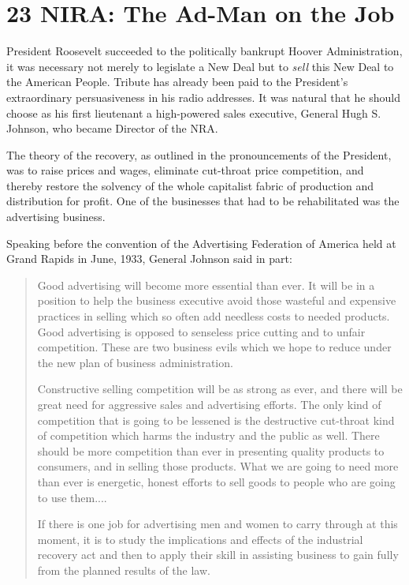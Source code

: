 \documentclass[twoside,nohyper,openany,nobib]{tufte-book}
\let\oldchapter\chapter
\def\chapter{%
  \setcounter{footnote}{0}%
  \oldchapter
}
\begin{document}
\chapter[23 \hspace*{1mm} NIRA: The Ad-Man on the Job]{23 NIRA: The Ad-Man on the Job}

 President Roosevelt succeeded to the politically bankrupt Hoover
Administration, it was necessary not merely to legislate a New Deal but
to \emph{sell} this New Deal to the American People. Tribute has already
been paid to the President's extraordinary persuasiveness in his radio
addresses. It was natural that he should choose as his first lieutenant
a high-powered sales executive, General Hugh S. Johnson, who became
Director of the NRA.

The theory of the recovery, as outlined in the pronouncements of the
President, was to raise prices and wages, eliminate cut-throat price
competition, and thereby restore the solvency of the whole capitalist
fabric of production and distribution for profit. One of the businesses
that had to be rehabilitated was the advertising business.

Speaking before the convention of the Advertising Federation of America
held at Grand Rapids in June, 1933, General Johnson said in part:

\begin{quote}
Good advertising will become more essential than ever. It will be in a
position to help the business executive avoid those wasteful and
expensive practices in selling which so often add needless costs to
needed products. Good advertising is opposed to senseless price cutting
and to unfair competition. These are two business evils which we hope to
reduce under the new plan of business administration.

Constructive selling competition will be as strong as ever, and there
will be great need for aggressive sales and advertising efforts. The
only kind of competition that is going to be lessened is the destructive
cut-throat kind of competition which harms the industry and the public
as well. There should be more competition than ever in presenting
quality products to consumers, and in selling those products. What we
are going to need more than ever is energetic, honest efforts to sell
goods to people who are going to use them....

If there is one job for advertising men and women to carry through at
this moment, it is to study the implications and effects of the
industrial recovery act and then to apply their skill in assisting
business to gain fully from the planned results of the law.
\end{quote}
\end{document}
